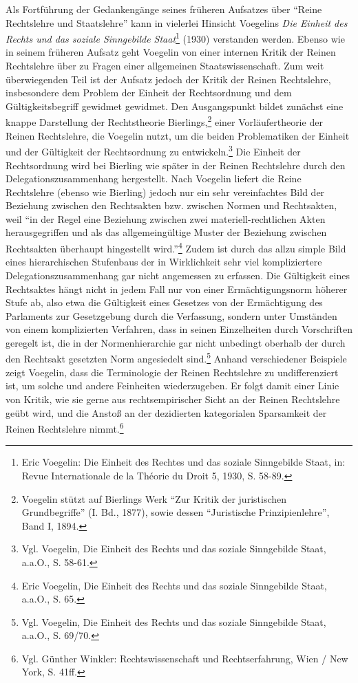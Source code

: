 \documentclass[12pt,a4paper,ngerman]{article}
\begin{document}
Als Fortführung der Gedankengänge seines früheren Aufsatzes über "`Reine
Rechtslehre und Staatslehre"' kann in vielerlei Hinsicht Voegelins {\em Die
  Einheit des Rechts und das soziale Sinngebilde Staat}\footnote{Eric
  Voegelin: Die Einheit des Rechtes und das soziale Sinngebilde Staat, in:
  Revue Internationale de la Théorie du Droit 5, 1930, S.  58-89.} (1930)
verstanden werden. Ebenso wie in seinem früheren Aufsatz geht Voegelin von
einer internen Kritik der Reinen Rechtslehre über zu Fragen einer allgemeinen
Staatswissenschaft. Zum weit überwiegenden Teil ist der Aufsatz jedoch der
Kritik der Reinen Rechtslehre, insbesondere dem Problem der Einheit der
Rechtsordnung und dem Gültigkeitsbegriff gewidmet gewidmet. Den Ausgangspunkt
bildet zunächst eine knappe Darstellung der Rechtstheorie
Bierlings,\footnote{Voegelin stützt auf Bierlings Werk "`Zur Kritik der
  juristischen Grundbegriffe"' (I. Bd., 1877), sowie dessen
"`Juristische
  Prinzipienlehre"', Band I, 1894.} einer Vorläufertheorie der Reinen
Rechtslehre, die Voegelin nutzt, um die beiden Problematiken der Einheit und
der Gültigkeit der Rechtsordnung zu entwickeln.\footnote{Vgl. Voegelin, Die
  Einheit des Rechts und das soziale Sinngebilde Staat, a.a.O., S. 58-61.} Die
Einheit der Rechtsordnung wird bei Bierling wie später in der Reinen
Rechtslehre durch den Delegationszusammenhang hergestellt. Nach Voegelin
liefert die Reine Rechtslehre (ebenso wie Bierling) jedoch nur ein sehr
vereinfachtes Bild der Beziehung zwischen den Rechtsakten bzw. zwischen Normen
und Rechtsakten, weil "`in der Regel eine Beziehung zwischen zwei
materiell-rechtlichen Akten herausgegriffen und als das allgemeingültige
Muster der Beziehung zwischen Rechtsakten überhaupt hingestellt
wird."'\footnote{Eric Voegelin, Die Einheit des Rechts und das soziale
  Sinngebilde Staat, a.a.O., S. 65.} Zudem ist durch das allzu simple Bild
eines hierarchischen Stufenbaus der in Wirklichkeit sehr viel kompliziertere
Delegationszusammenhang gar nicht angemessen zu erfassen. Die Gültigkeit eines
Rechtsaktes hängt nicht in jedem Fall nur von einer Ermächtigungsnorm
höherer
Stufe ab, also etwa die Gültigkeit eines Gesetzes von der Ermächtigung des
Parlaments zur Gesetzgebung durch die Verfassung, sondern unter Umständen von
einem komplizierten Verfahren, dass in seinen Einzelheiten durch Vorschriften
geregelt ist, die in der Normenhierarchie gar nicht unbedingt oberhalb der
durch den Rechtsakt gesetzten Norm angesiedelt sind.\footnote{Vgl. Voegelin,
  Die Einheit des Rechts und das soziale Sinngebilde Staat, a.a.O., S. 69/70.}
Anhand verschiedener Beispiele zeigt Voegelin, dass die Terminologie der
Reinen Rechtslehre zu undifferenziert ist, um solche und andere Feinheiten
wiederzugeben. Er folgt damit einer Linie von Kritik, wie sie gerne aus
rechtsempirischer Sicht an der Reinen Rechtslehre geübt wird, und die Anstoß
an der dezidierten kategorialen Sparsamkeit der Reinen Rechtslehre
nimmt.\footnote{Vgl. Günther Winkler: Rechtswissenschaft und Rechtserfahrung,
  Wien / New York, S. 41ff.}
\end{document}
